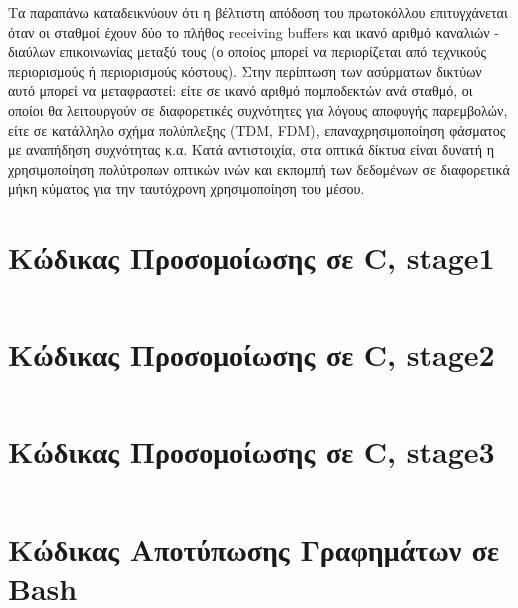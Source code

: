 \documentclass[12pt]{report}
\begin{document}
Τα παραπάνω καταδεικνύουν ότι η βέλτιστη απόδοση του πρωτοκόλλου επιτυγχάνεται όταν οι σταθμοί έχουν δύο το πλήθος \textlatin{receiving buffers} και ικανό αριθμό καναλιών - διαύλων επικοινωνίας μεταξύ τους (ο οποίος μπορεί να περιορίζεται από τεχνικούς περιορισμούς ή περιορισμούς κόστους). Στην περίπτωση των ασύρματων δικτύων αυτό μπορεί να μεταφραστεί: είτε σε ικανό αριθμό πομποδεκτών ανά σταθμό, οι οποίοι θα λειτουργούν σε διαφορετικές συχνότητες για λόγους αποφυγής παρεμβολών, είτε σε κατάλληλο σχήμα πολύπλεξης (\textlatin{TDM, FDM}), επαναχρησιμοποίηση φάσματος με αναπήδηση συχνότητας κ.α. Κατά αντιστοιχία, στα οπτικά δίκτυα είναι δυνατή η χρησιμοποίηση πολύτροπων οπτικών ινών και εκπομπή των δεδομένων σε διαφορετικά μήκη κύματος για την ταυτόχρονη χρησιμοποίηση του μέσου.

\begin{appendices}

\chapter{Κώδικας Προσομοίωσης σε \textlatin{C, stage1}}\label{AppA}
\inputminted[linenos, fontsize=\scriptsize, breaklines, baselinestretch=1]{c}{sources/slottedAloha_stage1.c}

\chapter{Κώδικας Προσομοίωσης σε \textlatin{C, stage2}}\label{AppB}
\inputminted[linenos, fontsize=\scriptsize, breaklines, baselinestretch=1]{c}{sources/slottedAloha_stage2.c}

\chapter{Κώδικας Προσομοίωσης σε \textlatin{C, stage3}}\label{AppC}
\inputminted[linenos, fontsize=\scriptsize, breaklines, baselinestretch=1]{c}{sources/slottedAloha_stage3.c}

\chapter{Κώδικας Αποτύπωσης Γραφημάτων σε \textlatin{Bash}}\label{AppD}
\inputminted[linenos, fontsize=\scriptsize, breaklines, baselinestretch=1]{bash}{sources/slottedAloha}
\end{appendices}

\appendix



\end{document}
